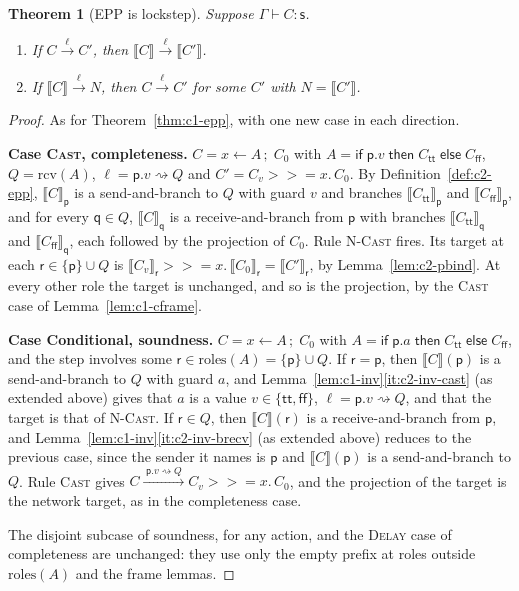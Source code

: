 \documentclass[11pt]{report}
\theoremstyle{plain}
\newtheorem{theorem}{Theorem}[chapter]
\theoremstyle{definition}
\theoremstyle{remark}
\newcommand{\kw}[1]{\mathsf{#1}}
\newcommand{\pp}{\mathsf{p}}
\newcommand{\qq}{\mathsf{q}}
\newcommand{\rr}{\mathsf{r}}
\newcommand{\sr}{\mathsf{s}}
\newcommand{\ttrue}{\kw{tt}}
\newcommand{\ffalse}{\kw{ff}}
\newcommand{\bind}[3]{#1 \leftarrow #2\,;\;#3}
\newcommand{\cif}[4]{\kw{if}\;#1.#2\;\kw{then}\;#3\;\kw{else}\;#4}
\newcommand{\mbind}[3]{#1 \mathbin{>\!\!>\!\!=} #2.\,#3}
\newcommand{\roles}[1]{\mathrm{roles}(#1)}
\newcommand{\rcv}[1]{\mathrm{rcv}(#1)}
\newcommand{\castlbl}[3]{#1.#2 \rightsquigarrow #3}
\newcommand{\lto}[1]{\xrightarrow{\;#1\;}}
\newcommand{\proj}[2]{\llbracket #1 \rrbracket_{#2}}
\newcommand{\projn}[1]{\llbracket #1 \rrbracket}
\newcommand{\rn}[1]{{\normalfont\scshape #1}}
\newcommand{\case}[1]{\medskip\noindent\textbf{Case #1.}\;}
\begin{document}
\begin{theorem}[EPP is lockstep]\label{thm:c2-epp}
  Suppose $\Gamma\vdash C:\sr$.
  \begin{enumerate}[label=(\arabic*),nosep]
  \item\label{it:c2-complete} If $C\lto{\ell}C'$, then $\projn{C}\lto{\ell}\projn{C'}$.
  \item\label{it:c2-sound} If $\projn{C}\lto{\ell}N$, then $C\lto{\ell}C'$
    for some $C'$ with $N=\projn{C'}$.
  \end{enumerate}
\end{theorem}
\begin{proof}
  As for Theorem~\ref{thm:c1-epp}, with one new case in each direction.

  \case{\rn{Cast}, completeness}
  $C=\bind{x}{A}{C_0}$ with $A=\cif{\pp}{v}{C_\ttrue}{C_\ffalse}$, $Q=\rcv{A}$,
  $\ell=\castlbl{\pp}{v}{Q}$ and $C'=\mbind{C_v}{x}{C_0}$.  By
  Definition~\ref{def:c2-epp}, $\proj{C}{\pp}$ is a send-and-branch to $Q$
  with guard $v$ and branches $\proj{C_\ttrue}{\pp}$ and $\proj{C_\ffalse}{\pp}$,
  and for every $\qq\in Q$, $\proj{C}{\qq}$ is a receive-and-branch from $\pp$
  with branches $\proj{C_\ttrue}{\qq}$ and $\proj{C_\ffalse}{\qq}$, each
  followed by the projection of $C_0$.  Rule \rn{N-Cast} fires.  Its target
  at each $\rr\in\{\pp\}\cup Q$ is
  $\mbind{\proj{C_v}{\rr}}{x}{\proj{C_0}{\rr}}=\proj{C'}{\rr}$, by
  Lemma~\ref{lem:c2-pbind}.  At every other role the target is unchanged,
  and so is the projection, by the \rn{Cast} case of
  Lemma~\ref{lem:c1-cframe}.

  \case{Conditional, soundness}
  $C=\bind{x}{A}{C_0}$ with $A=\cif{\pp}{a}{C_\ttrue}{C_\ffalse}$, and the
  step involves some $\rr\in\roles{A}=\{\pp\}\cup Q$.  If $\rr=\pp$, then
  $\projn{C}(\pp)$ is a send-and-branch to $Q$ with guard $a$, and
  Lemma~\ref{lem:c1-inv}\ref{it:c2-inv-cast} (as extended above) gives that $a$ is a value
  $v\in\{\ttrue,\ffalse\}$, $\ell=\castlbl{\pp}{v}{Q}$, and that the target is
  that of \rn{N-Cast}.  If $\rr\in Q$, then $\projn{C}(\rr)$ is a
  receive-and-branch from $\pp$, and
  Lemma~\ref{lem:c1-inv}\ref{it:c2-inv-brecv} (as extended above) reduces to the previous case,
  since the sender it names is $\pp$ and $\projn{C}(\pp)$ is a send-and-branch
  to $Q$.  Rule \rn{Cast} gives $C\lto{\castlbl{\pp}{v}{Q}}\mbind{C_v}{x}{C_0}$,
  and the projection of the target is the network target, as in the
  completeness case.

  The disjoint subcase of soundness, for any action, and the \rn{Delay} case
  of completeness are unchanged: they use only the empty prefix at roles
  outside $\roles{A}$ and the frame lemmas.
\end{proof}
\end{document}

